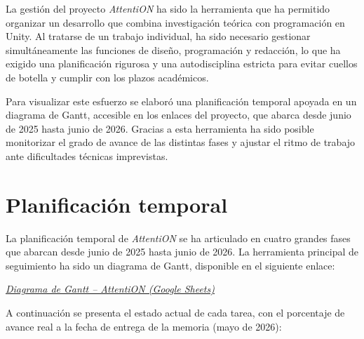 \documentclass[12pt, a4paper]{report}
\begin{document}
La gestión del proyecto \textit{AttentiON} ha sido la herramienta que ha
permitido organizar un desarrollo que combina investigación teórica con
programación en Unity. Al tratarse de un trabajo individual, ha sido necesario
gestionar simultáneamente las funciones de diseño, programación y redacción,
lo que ha exigido una planificación rigurosa y una autodisciplina estricta
para evitar cuellos de botella y cumplir con los plazos académicos.

Para visualizar este esfuerzo se elaboró una planificación temporal apoyada
en un diagrama de Gantt, accesible en los enlaces del proyecto, que abarca
desde junio de 2025 hasta junio de 2026. Gracias a esta herramienta ha
sido posible monitorizar el grado de avance de las distintas fases y ajustar
el ritmo de trabajo ante dificultades técnicas imprevistas.


\section{Planificación temporal}

La planificación temporal de \textit{AttentiON} se ha articulado en cuatro
grandes fases que abarcan desde junio de 2025 hasta junio de 2026. La
herramienta principal de seguimiento ha sido un diagrama de Gantt, disponible
en el siguiente enlace:

\begin{center}
\href{https://docs.google.com/spreadsheets/d/19SBDgHSgRw6bz_plAlHYkfWy23hx8tOTT-GIoEdbngE/edit?usp=sharing}%
{\textit{Diagrama de Gantt -- AttentiON (Google Sheets)}}
\end{center}

A continuación se presenta el estado actual de cada tarea, con el porcentaje
de avance real a la fecha de entrega de la memoria (mayo de 2026):
\end{document}
